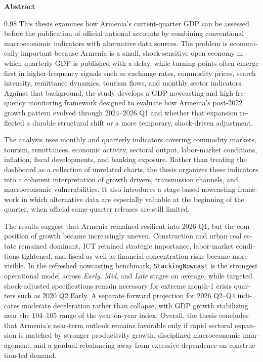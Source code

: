 \documentclass[12pt,a4paper]{report}
\begin{document}
        \begin{center}
        {\sffamily\bfseries Abstract}
        \end{center}
        \begin{english}
        \begin{spacing}{0.98}
        \small
        \sloppy
        This thesis examines how Armenia's current-quarter GDP can be assessed before the publication of official national accounts by combining conventional macroeconomic indicators with alternative data sources. The problem is economically important because Armenia is a small, shock-sensitive open economy in which quarterly GDP is published with a delay, while turning points often emerge first in higher-frequency signals such as exchange rates, commodity prices, search intensity, remittance dynamics, tourism flows, and monthly sector indicators. Against that background, the study develops a GDP nowcasting and high-frequency monitoring framework designed to evaluate how Armenia's post-2022 growth pattern evolved through 2024--2026 Q1 and whether that expansion reflected a durable structural shift or a more temporary, shock-driven adjustment.

The analysis uses monthly and quarterly indicators covering commodity markets, tourism, remittances, economic activity, sectoral output, labor-market conditions, inflation, fiscal developments, and banking exposure. Rather than treating the dashboard as a collection of unrelated charts, the thesis organizes these indicators into a coherent interpretation of growth drivers, transmission channels, and macroeconomic vulnerabilities. It also introduces a stage-based nowcasting framework in which alternative data are especially valuable at the beginning of the quarter, when official same-quarter releases are still limited.

The results suggest that Armenia remained resilient into 2026 Q1, but the composition of growth became increasingly uneven. Construction and urban real estate remained dominant, ICT retained strategic importance, labor-market conditions tightened, and fiscal as well as financial concentration risks became more visible. In the refreshed nowcasting benchmark, \texttt{StackingNowcast} is the strongest operational model across \textit{Early}, \textit{Mid}, and \textit{Late} stages on average, while targeted shock-adjusted specifications remain necessary for extreme month-1 crisis quarters such as 2020 Q2 Early. A separate forward projection for 2026 Q2--Q4 indicates moderate deceleration rather than collapse, with GDP growth stabilizing near the 104--105 range of the year-on-year index. Overall, the thesis concludes that Armenia's near-term outlook remains favorable only if rapid sectoral expansion is matched by stronger productivity growth, disciplined macroeconomic management, and a gradual rebalancing away from excessive dependence on construction-led demand.


\end{spacing}
\end{english}
\end{document}
